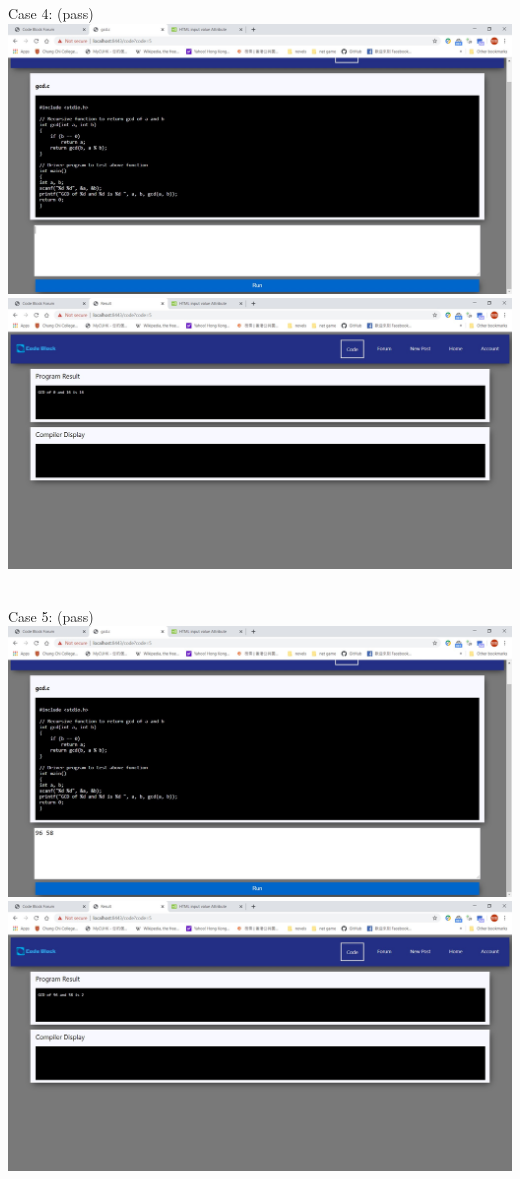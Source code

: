 Case 4: (pass)\\
\includegraphics[scale=0.45]{Doc/Pics/case-7-4-1}\\
\includegraphics[scale=0.45]{Doc/Pics/case-7-4-2}\\

~

Case 5: (pass)\\
\includegraphics[scale=0.45]{Doc/Pics/case-7-5-1}\\
\includegraphics[scale=0.45]{Doc/Pics/case-7-5-2}\\

